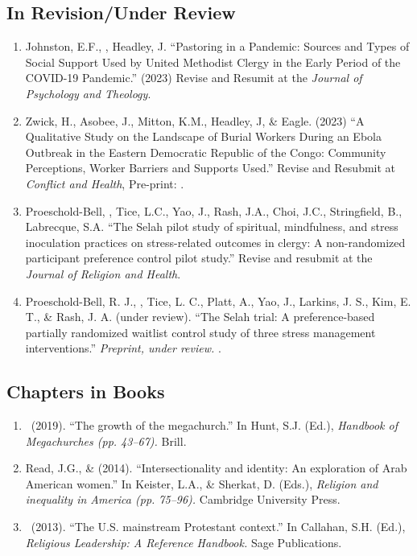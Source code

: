 \subsection*{In Revision/Under Review}
\begin{enumerate}

\item Johnston, E.F., \Eagle, Headley, J. ``Pastoring in a Pandemic: Sources and Types of Social Support Used by United Methodist Clergy in the Early Period of the COVID-19 Pandemic.'' (2023) Revise and Resumit at the \textit{Journal of Psychology and Theology}.

\item Zwick, H., Asobee, J., Mitton, K.M., Headley, J, \& Eagle\CS. (2023) ``A Qualitative Study on the Landscape of Burial Workers During an Ebola Outbreak in the Eastern Democratic Republic of the Congo: Community Perceptions, Worker Barriers and Supports Used.'' Revise and Resubmit at \textit{Conflict and Health}, Pre-print: .

\item Proeschold-Bell, \Eagle, Tice, L.C., Yao, J., Rash, J.A., Choi, J.C., Stringfield, B., Labrecque, S.A. ``The Selah pilot study of spiritual, mindfulness, and stress inoculation practices on stress-related outcomes in clergy: A non-randomized participant preference control pilot study.'' Revise and resubmit at the \textit{Journal of Religion and Health}.

\item Proeschold-Bell, R. J., \Eagle, Tice, L. C., Platt, A., Yao, J., Larkins, J. S., Kim, E. T., \& Rash, J. A. (under review). ``The Selah trial: A preference-based partially randomized waitlist control study of three stress management interventions.''  \textit{Preprint, under review.}  .

\end{enumerate}

\subsection*{Chapters in Books}
\begin{enumerate} 
\item \Eagle\ (2019). ``The growth of the megachurch.'' In Hunt, S.J. (Ed.), \emph{Handbook of Megachurches (pp. 43--67).} Brill.

\item Read, J.G., \& \Eagle \hspace{.01em}  (2014). ``Intersectionality and identity: An exploration of Arab American women.'' In Keister, L.A., \& Sherkat, D. (Eds.), \emph{Religion and inequality in America (pp. 75--96).} Cambridge University Press.

\item \Eagle\ (2013). ``The U.S. mainstream Protestant context.'' In Callahan, S.H. (Ed.), \emph{Religious Leadership: A Reference Handbook.} Sage Publications.
\end{enumerate}

